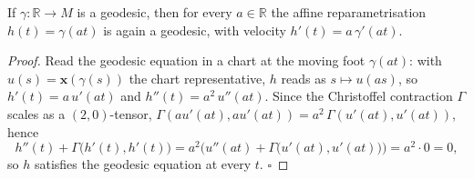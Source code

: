\begin{lemma}
  \label{lem:dc-ch3-2-6-reparam}
  \leanok
  If $\gamma:\mathbb{R}\to M$ is a geodesic, then for every $a\in\mathbb{R}$ the
  affine reparametrisation $h(t)=\gamma(at)$ is again a geodesic, with velocity
  $h'(t)=a\,\gamma'(at)$.
\end{lemma}
\begin{proof}
  \leanok
  Read the geodesic equation in a chart at the moving foot $\gamma(at)$: with
  $u(s)=\mathbf{x}(\gamma(s))$ the chart representative, $h$ reads as $s\mapsto
  u(as)$, so $h'(t)=a\,u'(at)$ and $h''(t)=a^2\,u''(at)$. Since the Christoffel
  contraction $\Gamma$ scales as a $(2,0)$-tensor,
  $\Gamma(au'(at),au'(at))=a^2\,\Gamma(u'(at),u'(at))$, hence
  $$
  h''(t)+\Gamma\big(h'(t),h'(t)\big)
    =a^2\Big(u''(at)+\Gamma\big(u'(at),u'(at)\big)\Big)=a^2\cdot 0=0,
  $$
  so $h$ satisfies the geodesic equation at every $t$. $\square$
\end{proof}

